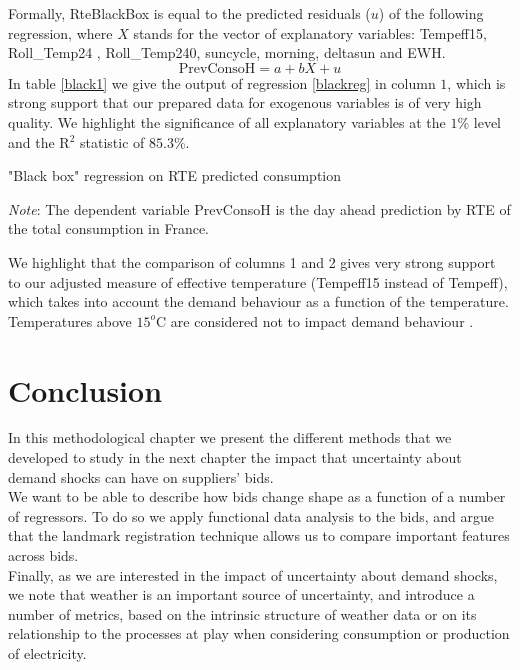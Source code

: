 Formally, RteBlackBox is equal to the predicted residuals ($u$) of the following regression, where $X$ stands for the vector of explanatory variables: Tempeff15,  Roll\_Temp24 ,  Roll\_Temp240, suncycle, morning, deltasun and EWH.  \\
\begin{equation}
\label{blackreg}
 \text{PrevConsoH} = a + bX +u 
\end{equation}
In table \ref{black1} we give the output of regression \ref{blackreg} in column $1$, which is strong support that our prepared data for exogenous variables is of very high quality. We highlight the significance of all explanatory variables at the $1\%$ level and the R$^2$ statistic of $85.3\%$. \\

\begin{table}[!ht]

\caption{\label{black1} "Black box" regression on RTE predicted consumption}
\emph{Note}: The dependent variable PrevConsoH is the day ahead prediction by RTE of the total consumption in France. 
\end{table}

We highlight that the comparison of columns 1 and 2 gives very strong support to our adjusted measure of effective temperature (Tempeff15 instead of Tempeff), which takes into account the demand behaviour as a function of the temperature. Temperatures above $15^o$C are considered not to impact demand behaviour \cite{rtewebsite1}.

\section{Conclusion}

In this methodological chapter we present the different methods that we developed to study in the next chapter the impact that uncertainty about demand shocks can have on suppliers' bids. \\

We want to be able to describe how bids change shape as a function of a number of regressors. To do so we apply functional data analysis to the bids, and argue that the landmark registration technique allows us to compare important features across bids. \\

Finally, as we are interested in the impact of uncertainty about demand shocks, we note that weather is an important source of uncertainty, and introduce a number of metrics, based on the intrinsic structure of weather data or on its relationship to the processes at play when considering consumption or production of electricity. \\

